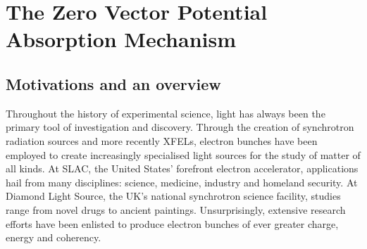 \chapter{\label{ch:2-zvp}The Zero Vector Potential Absorption Mechanism}

\minitoc
\section{Motivations and an overview}

Throughout the history of experimental science, light has always been the primary tool of investigation and discovery. Through the creation of synchrotron radiation sources and more recently XFELs, electron bunches have been employed to create increasingly specialised light sources for the study of matter of all kinds. At SLAC, the United States' forefront electron accelerator, applications hail from many disciplines: science, medicine, industry and homeland security. At Diamond Light Source, the UK's national synchrotron science facility, studies range from novel drugs to ancient paintings. Unsurprisingly, extensive research efforts have been enlisted to produce electron bunches of ever greater charge, energy and coherency. 
